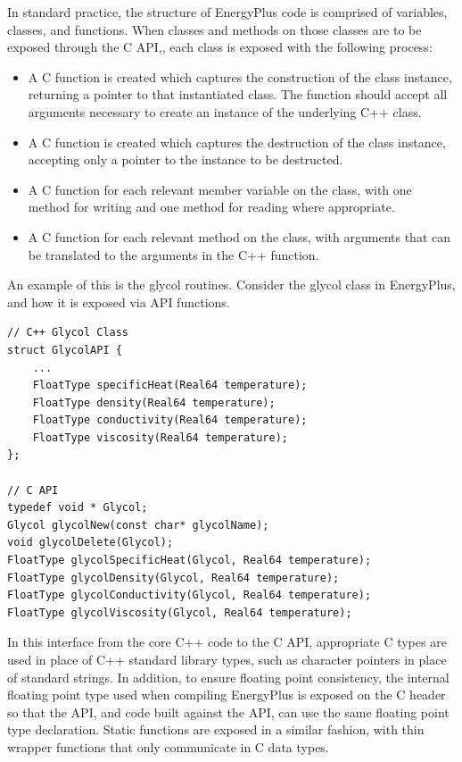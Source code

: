 \documentclass[5p]{elsarticle}
\begin{document}
In standard practice, the structure of EnergyPlus code is comprised of variables, classes, and functions.  When classes and methods on those classes are to be exposed through the C API,, each class is exposed with the following process:
\begin{itemize}
 \item A C function is created which captures the construction of the class instance, returning a pointer to that instantiated class.  The function should accept all arguments necessary to create an instance of the underlying C++ class.
 \item A C function is created which captures the destruction of the class instance, accepting only a pointer to the instance to be destructed.
 \item A C function for each relevant member variable on the class, with one method for writing and one method for reading where appropriate.  
 \item A C function for each relevant method on the class, with arguments that can be translated to the arguments in the C++ function.
\end{itemize}

An example of this is the glycol routines.  Consider the glycol class in EnergyPlus, and how it is exposed via API functions.

\lstset{language=c}
\begin{lstlisting}
// C++ Glycol Class
struct GlycolAPI {
    ...
    FloatType specificHeat(Real64 temperature);
    FloatType density(Real64 temperature);
    FloatType conductivity(Real64 temperature);
    FloatType viscosity(Real64 temperature);
};

// C API
typedef void * Glycol;
Glycol glycolNew(const char* glycolName);
void glycolDelete(Glycol);
FloatType glycolSpecificHeat(Glycol, Real64 temperature);
FloatType glycolDensity(Glycol, Real64 temperature);
FloatType glycolConductivity(Glycol, Real64 temperature);
FloatType glycolViscosity(Glycol, Real64 temperature);
\end{lstlisting}

In this interface from the core C++ code to the C API, appropriate C types are used in place of C++ standard library types, such as character pointers in place of standard strings.  In addition, to ensure floating point consistency, the internal floating point type used when compiling EnergyPlus is exposed on the C header so that the API, and code built against the API, can use the same floating point type declaration.  Static functions are exposed in a similar fashion, with thin wrapper functions that only communicate in C data types.
\end{document}
